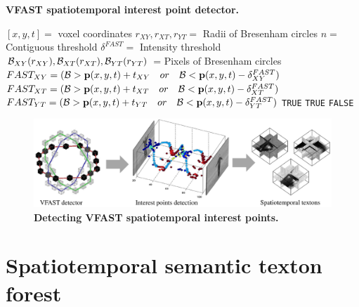 \begin{algorithm}
	\caption{\textbf{VFAST spatiotemporal interest point detector.}}
\label{algo/act/vfast}
\begin{algorithmic}
	\REQUIRE $[x,y,t] = $ voxel coordinates
	\REQUIRE $r_{XY},r_{XT},r_{YT} = $ Radii of Bresenham circles
	\REQUIRE $n = $ Contiguous threshold
	\REQUIRE $\delta^{FAST} = $ Intensity threshold
	\STATE $\mathcal{B}_{XY}(r_{XY}),\mathcal{B}_{XT}(r_{XT}),\mathcal{B}_{YT}(r_{YT})$ = Pixels of Bresenham circles
	\STATE $FAST_{XY} = ( \mathcal{B} > \mathbf{p}(x,y,t)+t_{XY}\quad or\quad \mathcal{B} < \mathbf{p}(x,y,t)-\delta^{FAST}_{XY} )$
	\STATE $FAST_{XT} = ( \mathcal{B} > \mathbf{p}(x,y,t)+t_{XT}\quad or\quad \mathcal{B} < \mathbf{p}(x,y,t)-\delta^{FAST}_{XT} )$
	\STATE $FAST_{YT} = ( \mathcal{B} > \mathbf{p}(x,y,t)+t_{YT}\quad or\quad \mathcal{B} < \mathbf{p}(x,y,t)-\delta^{FAST}_{YT} )$
		\RETURN \texttt{TRUE}
		\RETURN \texttt{TRUE}
	\ELSE
		\RETURN \texttt{FALSE}
	\ENDIF
\ENDIF
\end{algorithmic}
\end{algorithm}
\fi 


\begin{figure}[ht]
	\centering
	\includegraphics[width=1\linewidth]{fig/act/fig2_new.pdf}
	\caption{\textbf{Detecting VFAST spatiotemporal interest points.}}
	\label{fig/act/fastest}
\end{figure}


\section{Spatiotemporal semantic texton forest}
\label{sec/act/stf}

